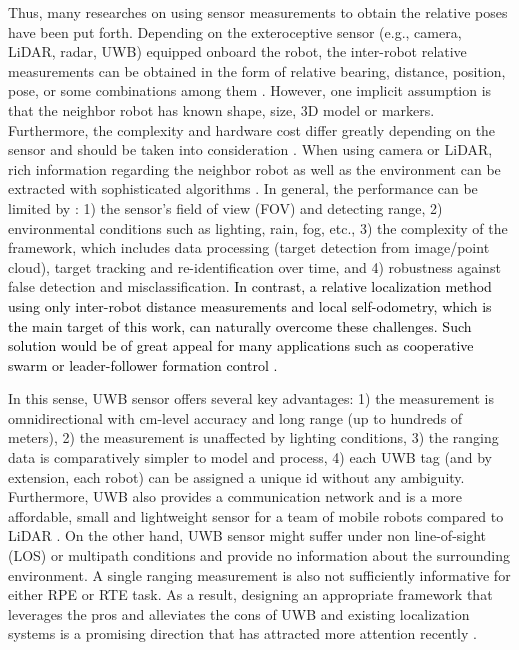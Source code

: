 \documentclass[journal]{IEEEtran}
\begin{document}
Thus, many researches on using sensor measurements to obtain the relative poses have been put forth. Depending on the exteroceptive sensor (e.g., camera, LiDAR, radar, UWB) equipped onboard the robot, the inter-robot relative measurements can be obtained in the form of relative bearing, distance, position, pose, or some combinations among them \cite{zhou2013relrangebearing,knuth2013colab}. However, one implicit assumption is that the neighbor robot has known shape, size, 3D model or markers. Furthermore, the complexity and hardware cost differ greatly depending on the sensor and should be taken into consideration \cite{de2017survey}. When using camera or LiDAR, rich information regarding the neighbor robot as well as the environment can be extracted with sophisticated algorithms \cite{shenghai2021ussurvey}. In general, the performance can be limited by \cite{de2017survey}: 1) the sensor's field of view (FOV) and detecting range, 2) environmental conditions such as lighting, rain, fog, etc., 3) the complexity of the framework, which includes data processing (target detection from image/point cloud), target tracking and re-identification over time, and 4) robustness against false detection and misclassification. \textcolor{black}{In contrast, a relative localization method using only inter-robot distance measurements and local self-odometry, which is the main target of this work, can naturally overcome these challenges. Such solution would be of great appeal for many applications such as cooperative swarm \cite{cornejo2015distributed} or leader-follower formation control \cite{nguyen2019distance}.}

In this sense, UWB sensor offers several key advantages: 1) the measurement is omnidirectional with cm-level accuracy and long range (up to hundreds of meters), 2) the measurement is unaffected by lighting conditions, 3) the ranging data is comparatively simpler to model and process, 4) each UWB tag (and by extension, each robot) can be assigned a unique id without any ambiguity. Furthermore, UWB also provides a communication network \cite{nguyen2018robust} and is a more affordable, small and lightweight sensor for a team of mobile robots compared to LiDAR \cite{shenghai2021ussurvey}. On the other hand, UWB sensor might suffer under non line-of-sight (LOS) or multipath conditions and provide no information about the surrounding environment. A single ranging measurement is also not sufficiently informative for either RPE or RTE task. As a result, designing an appropriate framework that leverages the pros and alleviates the cons of UWB and existing localization systems is a promising direction that has attracted more attention recently \cite{yu2021applications}.
\end{document}
